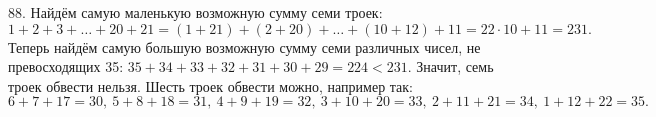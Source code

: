 88. Найдём самую маленькую возможную сумму семи троек: $1+2+3+\ldots+20+21=(1+21)+(2+20)+\ldots+(10+12)+11=22\cdot10+11=231.$ Теперь найдём самую большую возможную сумму семи различных чисел, не превосходящих 35: $35+34+33+32+31+30+29=224<231.$ Значит, семь троек обвести нельзя. Шесть троек обвести можно, например так:
$6+7+17=30,\ 5+8+18=31,\ 4+9+19=32,\ 3+10+20=33,\ 2+11+21=34,\ 1+12+22=35.$\\
